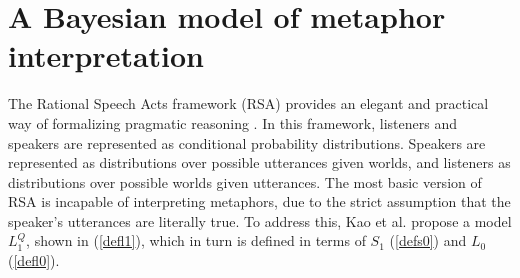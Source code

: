 \documentclass[9pt,twocolumn,twoside,lineno]{pnas-new}
\newcommand{\Listener}{L}
\newcommand{\QLONE}{\Listener_{{1}}^{{Q}}}
\begin{document}
\section{A Bayesian model of metaphor interpretation} \label{rsa}
	
	The Rational Speech Acts framework (RSA) provides an elegant and practical way of formalizing pragmatic reasoning \cite{frank2012predicting}.
	In this framework, listeners and speakers are represented as conditional probability distributions. Speakers are represented as distributions over possible utterances given worlds, and listeners as distributions over possible worlds given utterances.
	The most basic version of RSA \cite{frank2012predicting} is incapable of interpreting metaphors, due to the strict assumption that the speaker's utterances are literally true. To address this, Kao et al. \cite{kao} propose a model $\QLONE$, shown in (\ref{defl1}), which in turn is defined in terms of $S_1$ (\ref{defs0}) and $L_0$ (\ref{defl0}).






\end{document}
